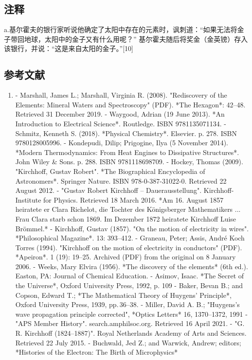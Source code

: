 \subsection{注释}  
a.基尔霍夫的银行家听说他确定了太阳中存在的元素时，讽刺道：“如果无法将金子带回地球，太阳中的金子又有什么用呢？” 基尔霍夫随后将奖金（金英镑）存入该银行，并说：“这是来自太阳的金子。”[10]
\subsection{参考文献}  
\begin{enumerate}
\item - Marshall, James L.; Marshall, Virginia R. (2008). "Rediscovery of the Elements: Mineral Waters and Spectroscopy" (PDF). *The Hexagon*: 42–48. Retrieved 31 December 2019.  
- Waygood, Adrian (19 June 2013). *An Introduction to Electrical Science*. Routledge. ISBN 9781135071134.  
- Schmitz, Kenneth S. (2018). *Physical Chemistry*. Elsevier. p. 278. ISBN 9780128005996.  
- Kondepudi, Dilip; Prigogine, Ilya (5 November 2014). *Modern Thermodynamics: From Heat Engines to Dissipative Structures*. John Wiley & Sons. p. 288. ISBN 9781118698709.  
- Hockey, Thomas (2009). "Kirchhoff, Gustav Robert". *The Biographical Encyclopedia of Astronomers*. Springer Nature. ISBN 978-0-387-31022-0. Retrieved 22 August 2012.  
- "Gustav Robert Kirchhoff – Dauerausstellung". Kirchhoff-Institute for Physics. Retrieved 18 March 2016. *Am 16. August 1857 heiratete er Clara Richelot, die Tochter des Königsberger Mathematikers ... Frau Clara starb schon 1869. Im Dezember 1872 heiratete Kirchhoff Luise Brömmel.*  
- Kirchhoff, Gustav (1857). "On the motion of electricity in wires". *Philosophical Magazine*. 13: 393–412.  
- Graneau, Peter; Assis, André Koch Torres (1994). "Kirchhoff on the motion of electricity in conductors" (PDF). *Apeiron*. 1 (19): 19–25. Archived (PDF) from the original on 8 January 2006.  
- Weeks, Mary Elvira (1956). *The discovery of the elements* (6th ed.). Easton, PA: Journal of Chemical Education.  
- Asimov, Isaac. *The Secret of the Universe*, Oxford University Press, 1992, p. 109  
- Baker, Bevan B.; and Copson, Edward T.; *The Mathematical Theory of Huygens' Principle*, Oxford University Press, 1939, pp. 36–38.  
- Miller, David A. B.; "Huygens's wave propagation principle corrected", *Optics Letters* 16, 1370–1372, 1991  
- "APS Member History". search.amphilsoc.org. Retrieved 16 April 2021.  
- "G. R. Kirchhoff (1824–1887)". Royal Netherlands Academy of Arts and Sciences. Retrieved 22 July 2015.  
- Buchwald, Jed Z.; and Warwick, Andrew; editors; *Histories of the Electron: The Birth of Microphysics*  

\end{enumerate}

